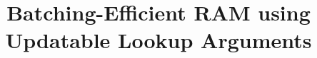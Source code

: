 \documentclass[sigconf]{acmart}
\begin{document}
	
	\title{Batching-Efficient RAM using Updatable Lookup Arguments}
	
	
\end{document}
